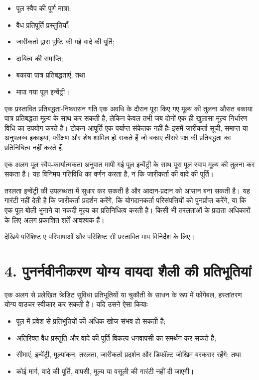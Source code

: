 \documentclass[11pt]{article}
\begin{document}
\begin{itemize}[leftmargin=*]
\item पूल स्वैप की पूर्ण मात्रा;
\item वैध प्रतिपूर्ति प्रस्तुतियाँ;
\item जारीकर्ता द्वारा पुष्टि की गई वादे की पूर्ति;
\item दायित्व की समाप्ति;
\item बकाया पात्र प्रतिबद्धताएं; तथा
\item मापा गया पूल इन्वेंट्री।
\end{itemize}
एक प्रस्तावित प्रतिबद्धता-निष्कासन गति एक अवधि के दौरान पूरा किए गए मूल्य की तुलना औसत बकाया पात्र प्रतिबद्धता मूल्य के साथ कर सकती है, लेकिन केवल तभी जब दोनों एक ही खुलासा मूल्य निर्धारण विधि का उपयोग करते हैं। टोकन आपूर्ति एक पर्याप्त संकेतक नहीं हैः इसमें जारीकर्ता सूची, समाप्त या अनुपलब्ध इकाइयां, परीक्षण और शेष शामिल हो सकते हैं जो बकाए तीसरे पक्ष की प्रतिबद्धता का प्रतिनिधित्व नहीं करते हैं.

एक अलग पूल स्वैप-कार्यात्मकता अनुपात मापी गई पूल इन्वेंट्री के साथ पूरा पूल स्वाप मूल्य की तुलना कर सकता है। यह विनिमय गतिविधि का वर्णन करता है, न कि जारीकर्ता की वादे की पूर्ति।

तरलता इन्वेंट्री की उपलब्धता में सुधार कर सकती है और आदान-प्रदान को आसान बना सकती है। यह गारंटी नहीं देती है कि जारीकर्ता प्रदर्शन करेंगे, कि योगदानकर्ता परिसंपत्तियों को पुनर्प्राप्त करेंगे, या कि एक पूल बोली भुनाने या नकदी मूल्य का प्रतिनिधित्व करती है। किसी भी तरलताओं के प्रदाता अधिकारों के लिए अलग प्रकाशित शर्तें आवश्यक हैं।

देखिये \href{https://docs.cosmolocal.credit/hi/white-paper/appendix-a-math-box}{परिशिष्ट ए} परिभाषाओं और \href{https://docs.cosmolocal.credit/hi/white-paper/appendix-c-kpi-definitions}{परिशिष्ट सी} प्रस्तावित माप विनिर्देश के लिए।


\section*{4. पुनर्नवीनीकरण योग्य वायदा शैली की प्रतिभूतियां}

एक अलग से प्रलेखित क्रेडिट सुविधा प्रतिभूतियों या चुकौती के साधन के रूप में फोंगेबल, हस्तांतरण योग्य वाउचर स्वीकार कर सकती है। यदि उसने ऐसा कियाः

\begin{itemize}[leftmargin=*]
\item पूल में प्रवेश से प्रतिभूतियों की अधिक खोज संभव हो सकती है;
\item अतिरिक्त वैध प्रस्तुति और वादे की पूर्ति विकल्प धनवापसी का समर्थन कर सकते हैं;
\item सीमाएं, इन्वेंट्री, मूल्यांकन, तरलता, जारीकर्ता प्रदर्शन और डिफॉल्ट जोखिम बरकरार रहेंगे; तथा
\item कोई मार्ग, वादे की पूर्ति, वापसी, मूल्य या वसूली की गारंटी नहीं दी जाएगी।
\end{itemize}
\end{document}
